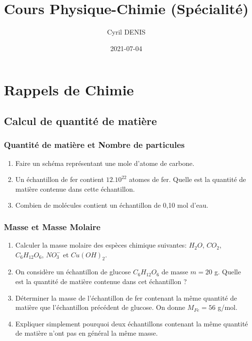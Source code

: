 \documentclass[
]{book}
\title{Cours Physique-Chimie (Spécialité)}
\author{Cyril DENIS}
\date{2021-07-04}
\providecommand{\tightlist}{%
  \setlength{\itemsep}{0pt}\setlength{\parskip}{0pt}}
\def\tightlist{}
\begin{document}
\maketitle

{
\setcounter{tocdepth}{1}
\tableofcontents
}
\hypertarget{rappels-de-chimie}{%
\chapter{Rappels de Chimie}\label{rappels-de-chimie}}

\hypertarget{calcul-de-quantituxe9-de-matiuxe8re}{%
\section{Calcul de quantité de matière}\label{calcul-de-quantituxe9-de-matiuxe8re}}

\hypertarget{quantituxe9-de-matiuxe8re-et-nombre-de-particules}{%
\subsection{Quantité de matière et Nombre de particules}\label{quantituxe9-de-matiuxe8re-et-nombre-de-particules}}

\begin{enumerate}
\def\labelenumi{\arabic{enumi}.}
\tightlist
\item
  Faire un schéma représentant une mole d'atome de carbone.
\item
  Un échantillon de fer contient \(12.10^{22}\) atomes de fer. Quelle est la quantité de matière contenue dans cette échantillon.
\item
  Combien de molécules contient un échantillon de 0,10 mol d'eau.
\end{enumerate}

\hypertarget{masse-et-masse-molaire}{%
\subsection{Masse et Masse Molaire}\label{masse-et-masse-molaire}}

\begin{enumerate}
\def\labelenumi{\arabic{enumi}.}
\tightlist
\item
  Calculer la masse molaire des espèces chimique suivantes: \(H_2O\), \(CO_2\), \(C_6H_{12}O_6\), \(NO_3^{-}\) et \(Cu(OH)_2\).
\item
  On considère un échantillon de glucose \(C_6H_{12}O_6\) de masse \(m=20\) g. Quelle est la quantité de matière contenue dans cet échantillon ?
\item
  Déterminer la masse de l'échantillon de fer contenant la même quantité de matière que l'échantillon précédent de glucose. On donne \(M_{Fe}=56\) g/mol.
\item
  Expliquer simplement pourquoi deux échantillons contenant la même quantité de matière n'ont pas en général la même masse.
\end{enumerate}
\end{document}
